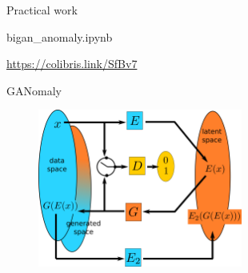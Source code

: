 \documentclass[xcolor=pdftex,dvipsnames,table,mathserif]{beamer}
\begin{document}
\begin{frame}{Practical work}

\begin{alertblock}{}
  bigan\_anomaly.ipynb
\end{alertblock}

\begin{block}{}
\url{https://colibris.link/SfBv7}
\end{block}

\end{frame}



\begin{frame}{GANomaly~\tiny{\cite{akcay_ganomaly:_2019}}}

  \begin{figure}[ht]
    \centering
    \includegraphics[width=0.6\textwidth]{ganomaly}
  \end{figure}



\end{frame}
\end{document}
